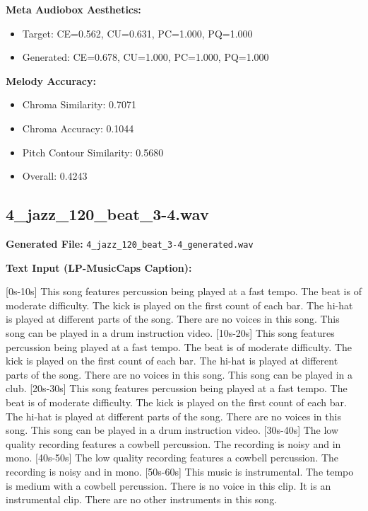 \documentclass{article}
\begin{document}
\textbf{Meta Audiobox Aesthetics:}
\begin{itemize}
    \item Target: CE=0.562, CU=0.631, PC=1.000, PQ=1.000
    \item Generated: CE=0.678, CU=1.000, PC=1.000, PQ=1.000
\end{itemize}

\textbf{Melody Accuracy:}
\begin{itemize}
    \item Chroma Similarity: 0.7071
    \item Chroma Accuracy: 0.1044
    \item Pitch Contour Similarity: 0.5680
    \item Overall: 0.4243
\end{itemize}

\subsection{4\_jazz\_120\_beat\_3-4.wav}

\textbf{Generated File:} \texttt{4\_jazz\_120\_beat\_3-4\_generated.wav}

\textbf{Text Input (LP-MusicCaps Caption):}

\small
[0s-10s] This song features percussion being played at a fast tempo. The beat is of moderate difficulty. The kick is played on the first count of each bar. The hi-hat is played at different parts of the song. There are no voices in this song. This song can be played in a drum instruction video. [10s-20s] This song features percussion being played at a fast tempo. The beat is of moderate difficulty. The kick is played on the first count of each bar. The hi-hat is played at different parts of the song. There are no voices in this song. This song can be played in a club. [20s-30s] This song features percussion being played at a fast tempo. The beat is of moderate difficulty. The kick is played on the first count of each bar. The hi-hat is played at different parts of the song. There are no voices in this song. This song can be played in a drum instruction video. [30s-40s] The low quality recording features a cowbell percussion. The recording is noisy and in mono. [40s-50s] The low quality recording features a cowbell percussion. The recording is noisy and in mono. [50s-60s] This music is instrumental. The tempo is medium with a cowbell percussion. There is no voice in this clip. It is an instrumental clip. There are no other instruments in this song.
\normalsize
\end{document}
